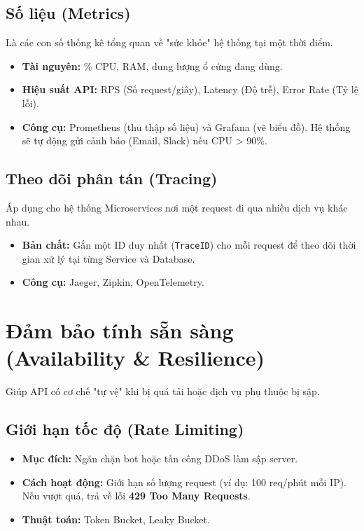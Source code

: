 \documentclass[12pt,a4paper]{article}
\begin{document}
\subsection{Số liệu (Metrics)}
Là các con số thống kê tổng quan về "sức khỏe" hệ thống tại một thời điểm.
\begin{itemize}
    \item \textbf{Tài nguyên:} \% CPU, RAM, dung lượng ổ cứng đang dùng.
    \item \textbf{Hiệu suất API:} RPS (Số request/giây), Latency (Độ trễ), Error Rate (Tỷ lệ lỗi).
    \item \textbf{Công cụ:} Prometheus (thu thập số liệu) và Grafana (vẽ biểu đồ). Hệ thống sẽ tự động gửi cảnh báo (Email, Slack) nếu CPU > 90\%.
\end{itemize}

\subsection{Theo dõi phân tán (Tracing)}
Áp dụng cho hệ thống Microservices nơi một request đi qua nhiều dịch vụ khác nhau.
\begin{itemize}
    \item \textbf{Bản chất:} Gắn một ID duy nhất (\texttt{TraceID}) cho mỗi request để theo dõi thời gian xử lý tại từng Service và Database.
    \item \textbf{Công cụ:} Jaeger, Zipkin, OpenTelemetry.
\end{itemize}

\section{Đảm bảo tính sẵn sàng (Availability \& Resilience)}
Giúp API có cơ chế "tự vệ" khi bị quá tải hoặc dịch vụ phụ thuộc bị sập.

\subsection{Giới hạn tốc độ (Rate Limiting)}
\begin{itemize}
    \item \textbf{Mục đích:} Ngăn chặn bot hoặc tấn công DDoS làm sập server.
    \item \textbf{Cách hoạt động:} Giới hạn số lượng request (ví dụ: 100 req/phút mỗi IP). Nếu vượt quá, trả về lỗi \textbf{429 Too Many Requests}.
    \item \textbf{Thuật toán:} Token Bucket, Leaky Bucket.
\end{itemize}
\end{document}
